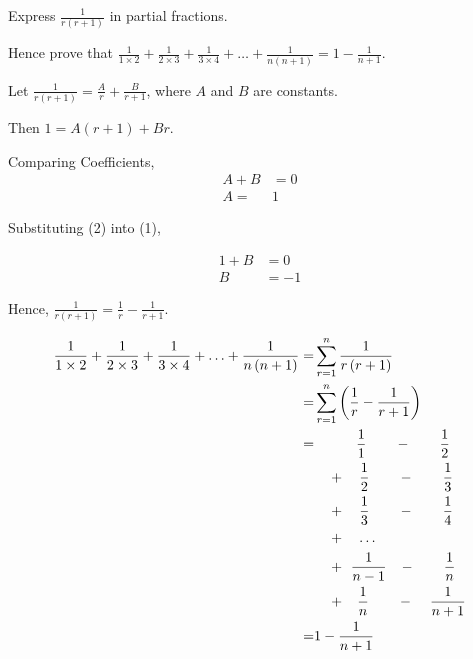 \documentclass[11pt,a4paper]{book}
\begin{document}
\begin{example}

Express ${\displaystyle \frac{1}{r\left(r+1\right)}}$ in partial
fractions.

Hence prove that ${\displaystyle \frac{1}{1\times2}+\frac{1}{2\times3}+\frac{1}{3\times4}+\ldots+\frac{1}{n\left(n+1\right)}=1-\frac{1}{n+1}}$.

\Solution

Let ${\displaystyle \frac{1}{r\left(r+1\right)}=\frac{A}{r}+\frac{B}{r+1}}$,
where $A$ and $B$ are constants.

Then $1=A\left(r+1\right)+Br$.

Comparing Coefficients,
\begin{align*}
A+B & =0\tag{1}\\
A= & 1\tag{2}
\end{align*}

Substituting (2) into (1),

\begin{align*}
1+B & =0\\
B & =-1
\end{align*}

Hence, ${\displaystyle \frac{1}{r\left(r+1\right)}=\frac{1}{r}-\frac{1}{r+1}}$.

\begin{align*}
\frac{1}{1\times2}+\frac{1}{2\times3}+\frac{1}{3\times4}+\ldots+\frac{1}{n\left(n+1\right)}= & \sum_{r=1}^{n}\frac{1}{r\left(r+1\right)}\\
= & \sum_{r=1}^{n}\left(\frac{1}{r}-\frac{1}{r+1}\right)\\
= & \hspace{2em}\quad\frac{1}{1}\qquad-\qquad\frac{1}{2}\\
 & \quad+\quad\frac{1}{2}\qquad-\qquad\frac{1}{3}\\
 & \quad+\quad\frac{1}{3}\qquad-\qquad\frac{1}{4}\\
 & \quad+\quad\ldots\\
 & \quad+\hspace{0.14cm}\frac{1}{n-1}\hspace{0.3cm}-\qquad\frac{1}{n}\\
 & \quad+\hspace{0.3cm}\frac{1}{n}\qquad-\hspace{0.4cm}\frac{1}{n+1}\\
= & 1-\frac{1}{n+1}
\end{align*}

\end{example}
\end{document}
